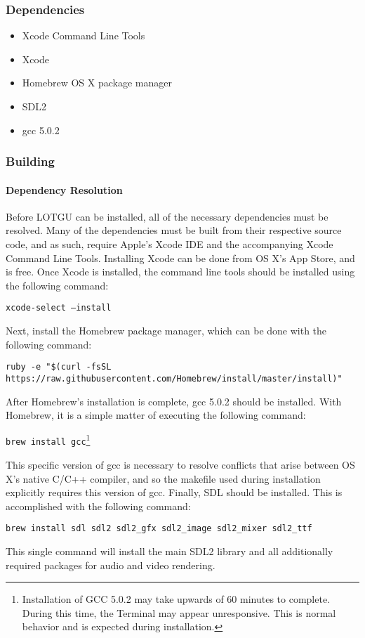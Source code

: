 \documentclass{article}
\begin{document}
		\subsubsection{Dependencies}
			\begin{itemize}
				\item Xcode Command Line Tools
				\item Xcode
				\item Homebrew OS X package manager
				\item SDL2 
				\item gcc 5.0.2
			\end{itemize}
		\subsubsection{Building}
			\paragraph{Dependency Resolution}
				Before LOTGU can be installed, all of the necessary dependencies must be resolved. Many of the dependencies must be built from their respective source code, and as such, require Apple's Xcode IDE and the accompanying Xcode Command Line Tools. Installing Xcode can be done from OS X's App Store, and is free. Once Xcode is installed, the command line tools should be installed using the following command:
				\begin{center}
					\colorbox{Gray!20}{\texttt{xcode-select --install}}
				\end{center}
				Next, install the Homebrew package manager, which can be done with the following command:
				\begin{center}
					\colorbox{Gray!20}{\texttt{ruby -e "\$(curl -fsSL https://raw.githubusercontent.com/Homebrew/install/master/install)"}}
				\end{center}
				 After Homebrew's installation is complete, gcc 5.0.2 should be installed. With Homebrew, it is a simple matter of executing the following command:
				\begin{center}
				 	\colorbox{Gray!20}{\texttt{brew install gcc}}\footnote{Installation of GCC 5.0.2 may take upwards of 60 minutes to complete. During this time, the Terminal may appear unresponsive. This is normal behavior and is expected during installation.}
				\end{center}
				This specific version of gcc is necessary to resolve conflicts that arise between OS X's native C/C++ compiler, and so the makefile used during installation explicitly requires this version of gcc. Finally, SDL should be installed. This is accomplished with the following command:
				\begin{center}
					 \colorbox{Gray!20}{\texttt{brew install sdl sdl2 sdl2\_gfx sdl2\_image sdl2\_mixer sdl2\_ttf}}
				\end{center}
				This single command will install the main SDL2 library and all additionally required packages for audio and video rendering. 
\end{document}
